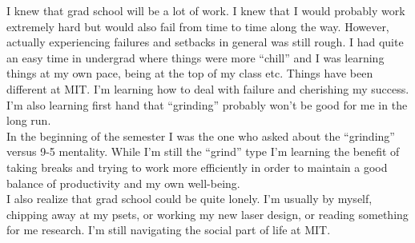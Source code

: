\documentclass{article}
\theoremstyle{definition}
\begin{document}
	
I knew that grad school will be a lot of work. I knew that I would probably work extremely hard but would also fail from time to time along the way. However, actually experiencing failures and setbacks in general was still rough. I had quite an easy time in undergrad where things were more ``chill'' and I was learning things at my own pace, being at the top of my class etc. Things have been different at MIT. I'm learning  how to deal with failure and cherishing my success. I'm also learning first hand that ``grinding'' probably won't be good for me in the long run. \\

In the beginning of the semester I was the one who asked about the ``grinding'' versus 9-5 mentality. While I'm still the ``grind'' type I'm learning the benefit of taking breaks and trying to work more efficiently in order to maintain a good balance of productivity and my own well-being. \\

I also realize that grad school could be quite lonely. I'm usually by myself, chipping away at my psets, or working my new laser design, or reading something for me research. I'm still navigating the social part of life at MIT. 
\end{document}
